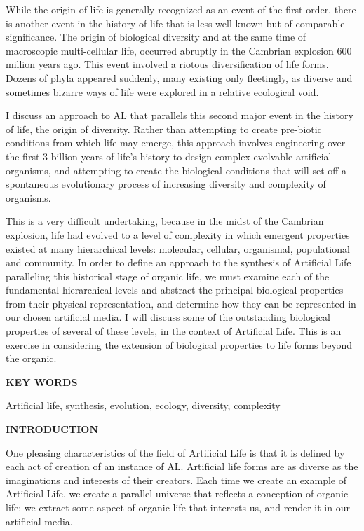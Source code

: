While the origin of life is generally recognized as an event of the first
order, there is another event in the history of life that is less well known
but of comparable significance.  The origin of biological diversity and at
the same time of macroscopic multi-cellular life, occurred abruptly in the
Cambrian explosion 600 million years ago.  This event involved a riotous
diversification of life forms.  Dozens of phyla appeared suddenly, many
existing only fleetingly, as diverse and sometimes bizarre ways of life
were explored in a relative ecological void.

I discuss an approach to AL that parallels this second
major event in the history of life, the origin of diversity.  Rather than
attempting to create pre-biotic conditions from which life may emerge, this
approach involves engineering over the first 3 billion years of life's
history to design complex evolvable artificial organisms, and attempting
to create the biological conditions that will set off a spontaneous
evolutionary process of increasing diversity and complexity of organisms.

This is a very difficult undertaking, because in the midst of the Cambrian
explosion, life had evolved to a level of complexity in which emergent
properties existed at many hierarchical levels: molecular, cellular,
organismal, populational and community.  In order to define an approach
to the synthesis of Artificial Life paralleling this historical stage of
organic life, we must examine each of the fundamental hierarchical levels
and abstract the principal biological properties from their physical
representation, and determine how they can be represented in our chosen
artificial media.  I will discuss some of the outstanding biological
properties of several of these levels, in the context of Artificial
Life.  This is an exercise in considering the extension of biological
properties to life forms beyond the organic.

\LP
\bf KEY WORDS\rm

Artificial life, synthesis, evolution, ecology, diversity, complexity

\newpage

\bf INTRODUCTION\rm
\eLP

One pleasing characteristics of the field of Artificial Life is that it
is defined by each act of creation of an instance of AL.  Artificial life
forms are as diverse as the imaginations and interests of their creators.
Each time we create an example of Artificial Life, we create a parallel
universe that reflects a conception of organic life; we extract some aspect
of organic life that interests us, and render it in our artificial media.

